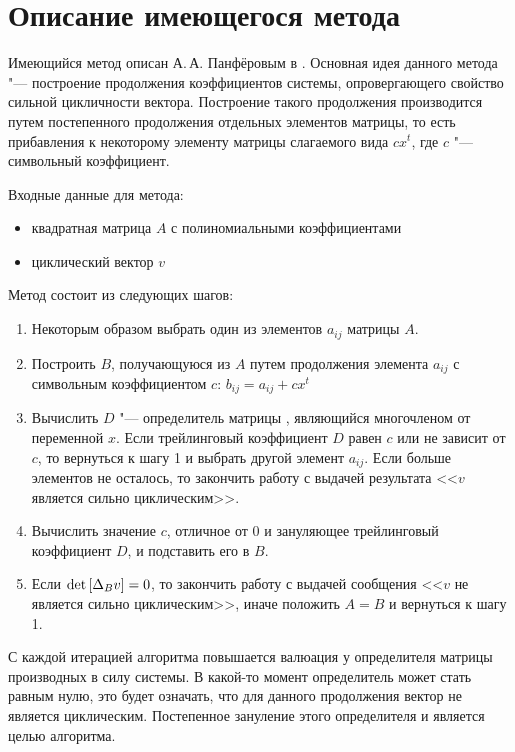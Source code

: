 \section{Описание имеющегося метода}

Имеющийся метод описан А.\,А. Панфёровым в \cite{litPanferov}.
Основная идея данного метода "--- построение продолжения коэффициентов системы, опровергающего свойство сильной цикличности вектора.
Построение такого продолжения производится путем постепенного продолжения отдельных элементов матрицы,
то есть прибавления к некоторому элементу матрицы слагаемого вида $cx^t$, где $c$ "--- символьный коэффициент.

Входные данные для метода:
\begin{itemize}
    \item
        квадратная матрица $A$ с полиномиальными коэффициентами
    \item
        циклический вектор $v$
\end{itemize}

Метод состоит из следующих шагов:
\begin{enumerate}
    \item
        Некоторым образом выбрать один из элементов $a_{ij}$ матрицы $A$.
    \item
        Построить $B$, получающуюся из $A$ путем продолжения элемента $a_{ij}$ с символьным коэффициентом $c$:
        $b_{ij} = a_{ij} + cx^t$
    \item
        Вычислить $D$ "--- определитель матрицы \diffMatrix[B], являющийся многочленом от переменной $x$.
        Если трейлинговый коэффициент $D$ равен $c$ или не зависит от $c$, то вернуться к шагу 1 и выбрать другой элемент $a_{ij}$.
        Если больше элементов не осталось, то закончить работу с выдачей результата <<$v$ является сильно циклическим>>.
    \item
        Вычислить значение $c$, отличное от 0 и зануляющее трейлинговый коэффициент $D$, и подставить его в $B$.
    \item
        Если $\mathop{\rm det}\text{$ [\Delta_B v] $} = 0$, то закончить работу с выдачей сообщения <<$v$ не является сильно циклическим>>,
        иначе положить $A = B$ и вернуться к шагу 1.
\end{enumerate}

С каждой итерацией алгоритма повышается валюация у определителя матрицы производных в силу системы.
В какой-то момент определитель может стать равным нулю, это будет означать,
что для данного продолжения вектор не является циклическим.
Постепенное зануление этого определителя и является целью алгоритма.

